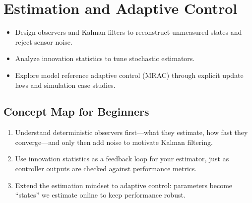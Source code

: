 \chapter{Estimation and Adaptive Control}
\label{chap:estimation}

\begin{learningobjective}
\begin{itemize}[leftmargin=*]
    \item Design observers and Kalman filters to reconstruct unmeasured states and reject sensor noise.
    \item Analyze innovation statistics to tune stochastic estimators.
    \item Explore model reference adaptive control (MRAC) through explicit update laws and simulation case studies.
\end{itemize}
\end{learningobjective}

\section{Concept Map for Beginners}
\begin{conceptroadmap}
\begin{enumerate}[leftmargin=*]
    \item Understand deterministic observers first—what they estimate, how fast they converge—and only then add noise to motivate Kalman filtering.
    \item Use innovation statistics as a feedback loop for your estimator, just as controller outputs are checked against performance metrics.
    \item Extend the estimation mindset to adaptive control: parameters become ``states'' we estimate online to keep performance robust.
\end{enumerate}
\end{conceptroadmap}

